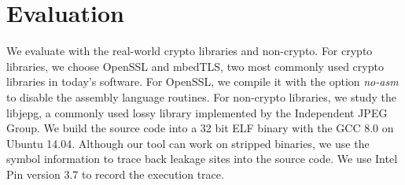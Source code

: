 \section{Evaluation}
We evaluate \tool{} with the real-world crypto libraries and non-crypto. 
For crypto libraries, we choose OpenSSL and mbedTLS, two most commonly used
crypto libraries in today's software. For OpenSSL, we compile it with the option \textit{no-asm} 
to disable the assembly language routines. For non-crypto libraries, 
we study the libjepg, a commonly used lossy library implemented by 
the Independent JPEG Group. We build the source code into a 32 bit 
ELF binary with the GCC 8.0 on Ubuntu 14.04. Although our tool can
work on stripped binaries, we use the symbol information to trace
back leakage sites into the source code. We use Intel Pin version 3.7 
to record the execution trace.

